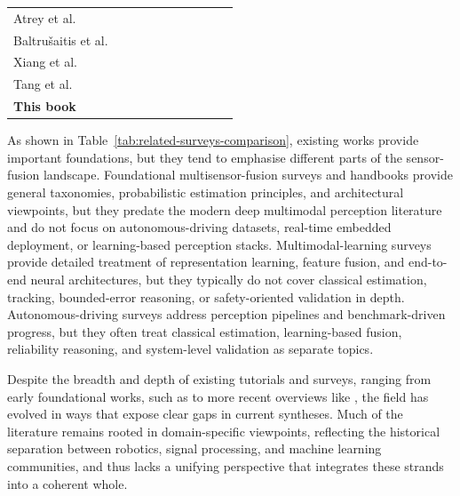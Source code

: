 \documentclass[11pt,oneside,openany]{book}
\newcommand{\cmark}{\textcolor{ForestGreen}{\ding{51}}}
\newcommand{\pmark}{\textcolor{Orange}{\ding{108}}}
\newcommand{\xmark}{\textcolor{red}{\ding{55}}}
\begin{document}
\begin{table}[!t]
{\begin{tabular}{p{}ccccccccc}
        Atrey et al.~\cite{atrey_multimodal_2010} &
        \pmark & \pmark & \pmark & \xmark & \cmark & \xmark & \pmark & \xmark & \pmark \\

        Baltru\v{s}aitis et al.~\cite{baltrusaitis_multimodal_2019} &
        \pmark & \xmark & \pmark & \xmark & \cmark & \pmark & \pmark & \xmark & \pmark \\

        Xiang et al.~\cite{2023:IEEE_ITSM} &
        \pmark & \pmark & \pmark & \xmark & \cmark & \cmark & \cmark & \pmark & \pmark \\

        Tang et al.~\cite{TANG2023109165} &
        \pmark & \pmark & \pmark & \xmark & \cmark & \cmark & \cmark & \pmark & \pmark \\

        \textbf{This book} &
        \cmark & \cmark & \cmark & \cmark & \cmark & \cmark & \cmark & \pmark & \cmark \\
        \hline
    \end{tabular}
    }
\end{table}
As shown in Table~\ref{tab:related-surveys-comparison}, existing works provide important foundations, but they tend to emphasise different parts of the sensor-fusion landscape. Foundational multisensor-fusion surveys and handbooks provide general taxonomies, probabilistic estimation principles, and architectural viewpoints, but they predate the modern deep multimodal perception literature and do not focus on autonomous-driving datasets, real-time embedded deployment, or learning-based perception stacks. Multimodal-learning surveys provide detailed treatment of representation learning, feature fusion, and end-to-end neural architectures, but they typically do not cover classical estimation, tracking, bounded-error reasoning, or safety-oriented validation in depth. Autonomous-driving surveys address perception pipelines and benchmark-driven progress, but they often treat classical estimation, learning-based fusion, reliability reasoning, and system-level validation as separate topics.

Despite the breadth and depth of existing tutorials and surveys, ranging from early foundational works, such as \cite{luo_multisensor_1989, hall_introduction_1997, liggins_handbook_2009, khaleghi_multisensor_2013} to more recent overviews like \cite{baltrusaitis_multimodal_2019, 2023:IEEE_ITSM,TANG2023109165}, the field has evolved in ways that expose clear gaps in current syntheses. Much of the literature remains rooted in domain-specific viewpoints, reflecting the historical separation between robotics, signal processing, and machine learning communities, and thus lacks a unifying perspective that integrates these strands into a coherent whole.
\end{document}
